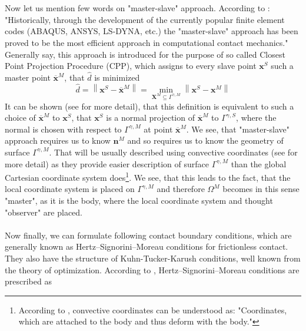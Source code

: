 \documentclass{article}
\begin{document}
\\
\\
Now let us mention few words on "master-slave" approach. According to \cite[Chapter 4, p.45-46]{Izi}: "Historically, through the development of the currently popular finite element codes (ABAQUS, ANSYS, LS-DYNA, etc.) the "master-slave" approach has been proved to be the most efficient approach in computational contact mechanics." Generally say, this approach is introduced for the purpose of so called Closest Point Projection Procedure (CPP), which assigns to every slave point $ \mathbf{x}^{S} $ such a master point $ \overline{\mathbf{x}}^{M} $, that $ \hat{d} $ is minimized
\begin{equation}\label{10}
\hat{d}=\left\|\mathbf{x}^{S}-\overline{\mathbf{x}}^{M}\right\|=\min _{\mathbf{X}^{M} \subseteq \Gamma^{\gamma,M}}\left\|\mathbf{x}^{S}-\mathbf{x}^{M}\right\|
\end{equation}
It can be shown (see \cite[Chapter 3, p.47]{Wriggers} for more detail), that this definition is equivalent to such a choice of $ \overline{\mathbf{x}}^{M} $ to $ \mathbf{x}^{S} $, that $ \mathbf{x}^{S} $ is a normal projection of $ \overline{\mathbf{x}}^{M} $ to $ \Gamma^{\gamma,S}$, where the normal is chosen with respect to $ \Gamma^{\gamma,M}$ at point $ \overline{\mathbf{x}}^{M} $. We see, that "master-slave" approach requires us to know $ \mathbf{n}^{M} $ and so requires us to know the geometry of surface $ \Gamma^{\gamma,M}$. That will be usually described using convective coordinates (see \cite[Appendix B]{Wriggers} for more detail) as they provide easier description of surface $ \Gamma^{\gamma,M}$ than the global Cartesian coordinate system does\footnote{According to \cite[Appendix B, p.405]{Wriggers}, convective coordinates can be understood as: "Coordinates, which are attached to the body and thus deform with the body."}. We see, that this leads to the fact, that the local coordinate system is placed on $ \Gamma^{\gamma,M}$ and therefore $ \Omega^{M}$ becomes in this sense "master", as it is the body, where the local coordinate system and thought "observer" are placed.    
\\
\\
Now finally, we can formulate following contact boundary conditions, which are generally known as Hertz–Signorini–Moreau conditions for frictionless contact. They also have the structure of Kuhn-Tucker-Karush conditions, well known from the theory of optimization. According to \cite[Chapter 5, p.97]{Wriggers}, Hertz–Signorini–Moreau conditions are prescribed as
\end{document}
